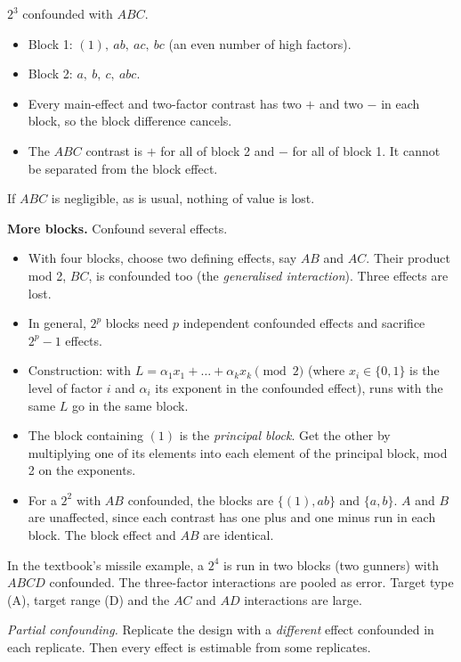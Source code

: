 \begin{example}
$2^3$ confounded with $ABC$.
\begin{itemize}
  \item Block 1: $(1),\ ab,\ ac,\ bc$ (an even number of high factors).
  \item Block 2: $a,\ b,\ c,\ abc$.
  \item Every main-effect and two-factor contrast has two $+$ and two $-$ in each block, so the block difference cancels.
  \item The $ABC$ contrast is $+$ for all of block 2 and $-$ for all of block 1. It cannot be separated from the block effect.
\end{itemize}
If $ABC$ is negligible, as is usual, nothing of value is lost.
\end{example}

\textbf{More blocks.} Confound several effects.
\begin{itemize}
  \item With four blocks, choose two defining effects, say $AB$ and $AC$. Their product mod 2, $BC$, is confounded too (the \emph{generalised interaction}). Three effects are lost.
  \item In general, $2^p$ blocks need $p$ independent confounded effects and sacrifice $2^p-1$ effects.
  \item Construction: with $L=\alpha_1x_1+\dots+\alpha_kx_k\pmod2$ (where $x_i\in\{0,1\}$ is the level of factor $i$ and $\alpha_i$ its exponent in the confounded effect), runs with the same $L$ go in the same block.
  \item The block containing $(1)$ is the \emph{principal block}. Get the other by multiplying one of its elements into each element of the principal block, mod 2 on the exponents.
  \item For a $2^2$ with $AB$ confounded, the blocks are $\{(1),ab\}$ and $\{a,b\}$. $A$ and $B$ are unaffected, since each contrast has one plus and one minus run in each block. The block effect and $AB$ are identical.
\end{itemize}
In the textbook's missile example, a $2^4$ is run in two blocks (two gunners) with $ABCD$ confounded. The three-factor interactions are pooled as error. Target type (A), target range (D) and the $AC$ and $AD$ interactions are large.

\emph{Partial confounding.} Replicate the design with a \emph{different} effect confounded in each replicate. Then every effect is estimable from some replicates.

